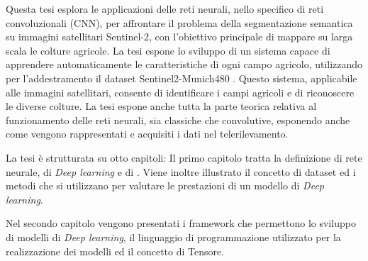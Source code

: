 

Questa tesi esplora le applicazioni delle reti neurali, nello specifico di reti 
convoluzionali (CNN), per affrontare il problema della segmentazione semantica 
su immagini satellitari Sentinel-2, con l'obiettivo principale di mappare su 
larga scala le colture agricole.
La tesi espone lo sviluppo di un sistema capace di apprendere 
automaticamente le caratteristiche di ogni campo agricolo, utilizzando per l’addestramento 
il dataset Sentinel2-Munich480 \cite{Munich480}.
Questo sistema, applicabile alle immagini satellitari, 
consente di identificare i campi agricoli e di riconoscere le diverse colture.
La tesi espone anche tutta la parte teorica relativa al funzionamento delle reti neurali, sia classiche 
che convolutive, esponendo anche come vengono rappresentati e acquisiti i dati nel telerilevamento. 


La tesi è strutturata su otto capitoli:
Il primo capitolo tratta la definizione di rete neurale, di \textit{Deep learning} e di 
.
Viene inoltre illustrato il concetto di dataset ed i metodi che si utilizzano per 
valutare le prestazioni di un modello di \textit{Deep learning}.

Nel secondo capitolo vengono presentati i framework che permettono lo sviluppo di modelli 
di \textit{Deep learning}, il linguaggio di programmazione utilizzato per la realizzazione dei 
modelli ed il concetto di Tensore.

